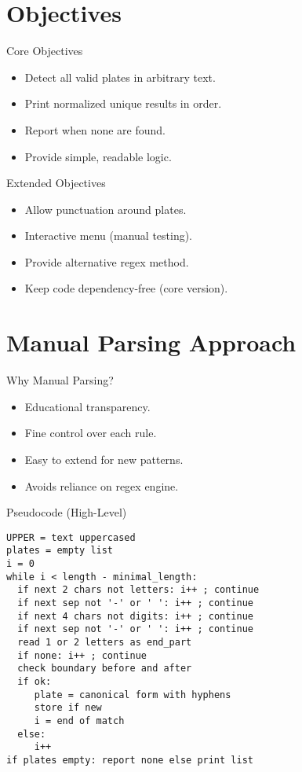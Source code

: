 \documentclass[aspectratio=169]{beamer}
\begin{document}
\section{Objectives}

\begin{frame}{Core Objectives}
  \begin{itemize}
    \item Detect all valid plates in arbitrary text.
    \item Print normalized unique results in order.
    \item Report when none are found.
    \item Provide simple, readable logic.
  \end{itemize}
\end{frame}

\begin{frame}{Extended Objectives}
  \begin{itemize}
    \item Allow punctuation around plates.
    \item Interactive menu (manual testing).
    \item Provide alternative regex method.
    \item Keep code dependency-free (core version).
  \end{itemize}
\end{frame}

\section{Manual Parsing Approach}

\begin{frame}{Why Manual Parsing?}
  \begin{itemize}
    \item Educational transparency.
    \item Fine control over each rule.
    \item Easy to extend for new patterns.
    \item Avoids reliance on regex engine.
  \end{itemize}
\end{frame}

\begin{frame}[fragile]{Pseudocode (High-Level)}
\begin{verbatim}
UPPER = text uppercased
plates = empty list
i = 0
while i < length - minimal_length:
  if next 2 chars not letters: i++ ; continue
  if next sep not '-' or ' ': i++ ; continue
  if next 4 chars not digits: i++ ; continue
  if next sep not '-' or ' ': i++ ; continue
  read 1 or 2 letters as end_part
  if none: i++ ; continue
  check boundary before and after
  if ok:
     plate = canonical form with hyphens
     store if new
     i = end of match
  else:
     i++
if plates empty: report none else print list
\end{verbatim}
\end{frame}
\end{document}
